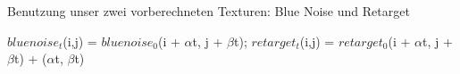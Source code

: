\begin{algorithm}[H]
    \caption{Benutzung unser zwei vorberechneten Texturen: Blue Noise und Retarget}
    \begin{algorithmic}[1]
        \State $bluenoise_{t}$(i,j) = $bluenoise_{0}$(i + $\alpha$t, j + $\beta$t); 
        \State $retarget_{t}$(i,j) = $retarget_{0}$(i + $\alpha$t, j + $\beta$t) + ($\alpha$t, $\beta$t)
    \end{algorithmic}
    \label{alg:Benutzung vorberechneter Texturen}
\end{algorithm}